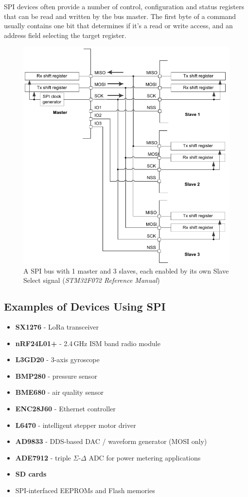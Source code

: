SPI devices often provide a number of control, configuration and status registers that can be read and written by the bus master. The first byte of a command usually contains one bit that determines if it's a read or write access, and an address field selecting the target register.

\begin{figure}
	\centering
	\includegraphics[width=.7\textwidth] {img/spi-multislave.png}
	\caption[SPI master with multiple slaves]{\label{fig:spi-multislave}A SPI bus with 1 master and 3 slaves, each enabled by its own Slave Select signal (\textit{STM32F072 Reference Manual})}
\end{figure}

\subsection{Examples of Devices Using SPI}

\begin{itemize}
	\item \textbf{SX1276} - LoRa transceiver
	\item \textbf{nRF24L01+} - 2.4\,GHz ISM band radio module
	\item \textbf{L3GD20} - 3-axis gyroscope
	\item \textbf{BMP280} - pressure sensor
	\item \textbf{BME680} - air quality sensor
	\item \textbf{ENC28J60} - Ethernet controller
	\item \textbf{L6470} - intelligent stepper motor driver
	\item \textbf{AD9833} - DDS-based DAC / waveform generator (MOSI only)
	\item \textbf{ADE7912} - triple $\Sigma$-$\Delta$ ADC for power metering applications
	\item \textbf{SD cards}
	\item SPI-interfaced EEPROMs and Flash memories	
\end{itemize}

